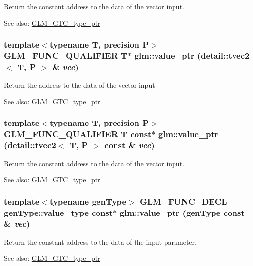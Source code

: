 Return the constant address to the data of the vector input. \begin{Desc}
\item[See also:]\hyperlink{group__gtc__type__ptr}{GLM\_\-GTC\_\-type\_\-ptr} \end{Desc}
\hypertarget{group__gtc__type__ptr_gfb7060ef2ca0edab610e0069ed911531}{
\subsubsection[value\_\-ptr]{\setlength{\rightskip}{0pt plus 5cm}template$<$typename T, precision P$>$ GLM\_\-FUNC\_\-QUALIFIER T$\ast$ glm::value\_\-ptr (detail::tvec2$<$ T, P $>$ \& {\em vec})}}
\label{group__gtc__type__ptr_gfb7060ef2ca0edab610e0069ed911531}


Return the address to the data of the vector input. \begin{Desc}
\item[See also:]\hyperlink{group__gtc__type__ptr}{GLM\_\-GTC\_\-type\_\-ptr} \end{Desc}
\hypertarget{group__gtc__type__ptr_gb43f07f8b8793c17c58c7b5826d4d5ff}{
\subsubsection[value\_\-ptr]{\setlength{\rightskip}{0pt plus 5cm}template$<$typename T, precision P$>$ GLM\_\-FUNC\_\-QUALIFIER T const$\ast$ glm::value\_\-ptr (detail::tvec2$<$ T, P $>$ const \& {\em vec})}}
\label{group__gtc__type__ptr_gb43f07f8b8793c17c58c7b5826d4d5ff}


Return the constant address to the data of the vector input. \begin{Desc}
\item[See also:]\hyperlink{group__gtc__type__ptr}{GLM\_\-GTC\_\-type\_\-ptr} \end{Desc}
\hypertarget{group__gtc__type__ptr_g87d5cb613f75f83973609ccb8922200b}{
\subsubsection[value\_\-ptr]{\setlength{\rightskip}{0pt plus 5cm}template$<$typename genType$>$ GLM\_\-FUNC\_\-DECL genType::value\_\-type const$\ast$ glm::value\_\-ptr (genType const \& {\em vec})}}
\label{group__gtc__type__ptr_g87d5cb613f75f83973609ccb8922200b}


Return the constant address to the data of the input parameter. \begin{Desc}
\item[See also:]\hyperlink{group__gtc__type__ptr}{GLM\_\-GTC\_\-type\_\-ptr} \end{Desc}

